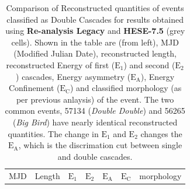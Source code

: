 \begin{table}[h!]
    \caption[Comparison of Reconstructed quantities of re-analysed HESE-7.5 data by using Spice-Bfr ice model with published HESE-7.5 events]{Comparison of Reconstructed quantities of events classified as Double Cascades for results obtained using \textbf{Re-analysis Legacy} and \textbf{HESE-7.5} (grey cells). Shown in the table are (from left), MJD (Modified Julian Date), reconstructed length, reconstructed Energy of first ($\mathrm{E}_1$) and second ($\mathrm{E}_2$) cascades, Energy asymmetry ($\mathrm{E}_\mathrm{A}$), Energy Confinement ($\mathrm{E}_\mathrm{C}$) and classified morphology (as per previous anlaysis) of the event. The two common events, 57134 (\emph{Double Double}) and 56265 (\emph{Big Bird}) have nearly identical reconstructed quantities. The change in $\mathrm{E}_1$ and $\mathrm{E}_2$ changes the $\mathrm{E}_\mathrm{A}$, which is the discrimation cut between single and double cascades.}
    \begin{tabular}{c|cc|cc|cc|cc|cc|c}
        \toprule
         MJD    & \multicolumn{2}{c|}{Length}
                
                        & \multicolumn{2}{c|}{$\mathrm{E}_\mathrm{1}$}
                                & \multicolumn{2}{c|}{$\mathrm{E}_\mathrm{2}$} 
                                    & \multicolumn{2}{c|}{$\mathrm{E}_\mathrm{A}$} 
                                        & \multicolumn{2}{c|}{$\mathrm{E}_\mathrm{C}$}  
                                            & \multicolumn{1}{c}{morphology}                \\
                       

\end{tabular}
\end{table}
